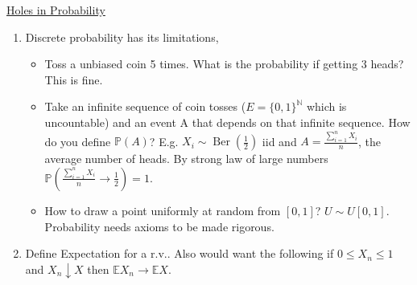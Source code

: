     \underline{Holes in Probability}

    \begin{enumerate}
        \item Discrete probability has its limitations,
        \begin{itemize}
            \item Toss a unbiased coin 5 times. What is the probability if getting 3 heads? This is fine.
            \item Take an infinite sequence of coin tosses ($E = \{0, 1\}^\mathbb{N}$ which is uncountable) and an event A that depends on that infinite sequence. How do you define $\mathbb{P}(A)$?
            E.g. $X_i \sim \operatorname{Ber}\left( \frac{1}{2} \right)$ iid and $A = \frac{\sum_{i=1}^{n} X_i}{n}$, the average number of heads.
            By strong law of large numbers $\mathbb{P}\left( \frac{\sum_{i=1}^{n} X_i}{n} \to \frac{1}{2} \right) = 1$.
            \item How to draw a point uniformly at random from $[0, 1]$? $U \sim U[0, 1]$.
            Probability needs axioms to be made rigorous.
        \end{itemize}
        \item Define Expectation for a r.v.. Also would want the following if $0 \leq X_n \leq 1$ and $X_n \downarrow X$ then $\mathbb{E} X_n \to \mathbb{E} X$.
    \end{enumerate}

    
    
    
    
    
    
    
